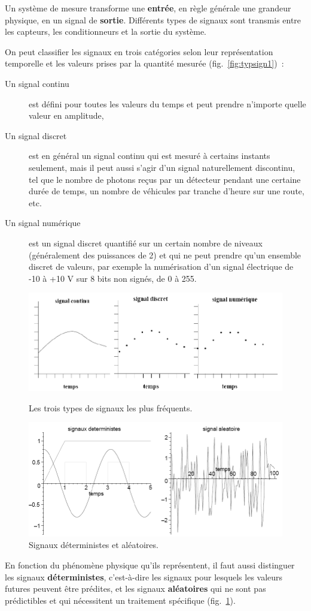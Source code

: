 Un système de mesure transforme une \textbf{entrée}, en règle générale une grandeur physique, en un signal de \textbf{sortie}. Différents types de signaux sont transmis entre les capteurs, les conditionneurs et la sortie du système.

On peut classifier les signaux en trois catégories selon leur représentation temporelle et les valeurs prises par la quantité mesurée (fig.~\ref{fig:typsign1})~:
\begin{description}
\item[Un signal continu] est défini pour toutes les valeurs du temps et peut prendre n'importe quelle valeur en amplitude,
\item[Un signal discret] est en général un signal continu qui est mesuré à certains instants seulement, mais il peut aussi s'agir d'un signal naturellement discontinu, tel que le nombre de photons reçus par un détecteur pendant une certaine durée de temps, un nombre de véhicules par tranche d'heure sur une route, etc.
\item[Un signal numérique] est un signal discret quantifié sur un certain nombre de niveaux (généralement des puissances de 2) et qui ne peut prendre qu'un ensemble discret de valeurs, par exemple la numérisation d'un signal électrique de -10 à +10 V sur 8 bits non signés, de 0 à 255.
\end{description}
\begin{figure}[h]
   \centering
   \includegraphics[width=13cm]{assets/figures/typesign.pdf}
   \caption{Les trois types de signaux les plus fréquents.}\vspace{5mm}
   \label{fig:typsign1}
   \centering
   \includegraphics[width=13cm]{assets/figures/sigda.pdf}
   \caption{Signaux déterministes et aléatoires.}
   \label{fig:sigda1}
\end{figure}
En fonction du phénomène physique qu'ils représentent, il faut aussi distinguer les signaux \textbf{déterministes}, c'est-à-dire les signaux pour lesquels les valeurs futures peuvent être prédites, et les signaux \textbf{aléatoires} qui ne sont pas prédictibles et qui nécessitent un traitement spécifique (fig.~\ref{fig:sigda1}).

